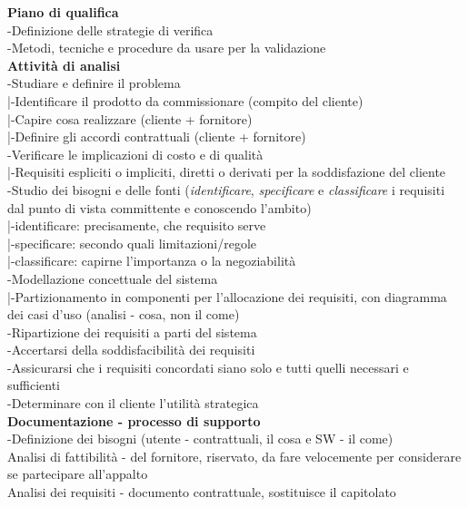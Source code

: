 \documentclass{article}
\begin{document}
		\textbf{Piano di qualifica}\\
		-Definizione delle strategie di verifica\\
		-Metodi, tecniche e procedure da usare per la validazione\\
	
		\textbf{Attività di analisi}\\
		-Studiare e definire il problema\\
		|-Identificare il prodotto da commissionare (compito del cliente)\\
		|-Capire cosa realizzare (cliente + fornitore)\\
		|-Definire gli accordi contrattuali (cliente + fornitore)\\
		-Verificare le implicazioni di costo e di qualità\\
		|-Requisiti espliciti o impliciti, diretti o derivati per la soddisfazione del cliente\\
		-Studio dei bisogni e delle fonti (\textit{identificare}, \textit{specificare} e \textit{classificare} i requisiti dal punto di vista committente e conoscendo l'ambito)\\
		|-identificare: precisamente, che requisito serve\\
		|-specificare: secondo quali limitazioni/regole\\
		|-classificare: capirne l'importanza o la negoziabilità\\
		-Modellazione concettuale del sistema\\
		|-Partizionamento in componenti per l'allocazione dei requisiti, con diagramma dei casi d'uso (analisi - cosa, non il come)\\
		-Ripartizione dei requisiti a parti del sistema\\
		-Accertarsi della soddisfacibilità dei requisiti\\
		-Assicurarsi che i requisiti concordati siano solo e tutti quelli necessari e sufficienti\\
		-Determinare con il cliente l'utilità strategica\\
		
		\textbf{Documentazione - processo di supporto}\\
		-Definizione dei bisogni (utente - contrattuali, il cosa e SW - il come)\\
		Analisi di fattibilità - del fornitore, riservato, da fare velocemente per considerare se partecipare all'appalto\\
		Analisi dei requisiti - documento contrattuale, sostituisce il capitolato\\
		
\end{document}
